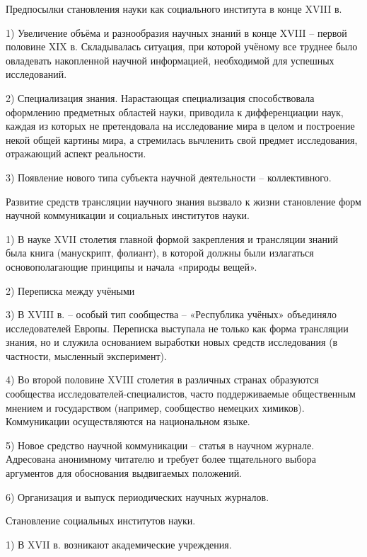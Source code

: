 \documentclass[exam_answers.tex]{subfiles}
\begin{document}
\renewcommand{\baselinestretch}{0.75}

\vspace{-10pt}

Предпосылки становления науки как социального института в конце XVIII в.

1) Увеличение объёма и разнообразия научных знаний в конце XVIII – первой половине XIX в. Складывалась ситуация, при которой учёному все труднее было овладевать накопленной научной информацией, необходимой для успешных исследований.

2) Специализация знания. Нарастающая специализация способствовала оформлению предметных областей науки, приводила к дифференциации наук, каждая из которых не претендовала на исследование мира в целом и построение некой общей картины мира, а стремилась вычленить свой предмет исследования, отражающий аспект реальности.

3) Появление нового типа субъекта научной деятельности – коллективного.

Развитие средств трансляции научного знания вызвало к жизни становление форм научной коммуникации и социальных институтов науки.

1) В науке XVII столетия главной формой закрепления и трансляции знаний была книга (манускрипт, фолиант), в которой должны были излагаться основополагающие принципы и начала «природы вещей».

2) Переписка между учёными

3) В XVIII в. – особый тип сообщества – «Республика учёных» объединяло исследователей Европы. Переписка выступала не только как форма трансляции знания, но и служила основанием выработки новых средств исследования (в частности, мысленный эксперимент).

4) Во второй половине XVIII столетия в различных странах образуются сообщества исследователей-специалистов, часто поддерживаемые общественным мнением и государством (например, сообщество немецких химиков). Коммуникации осуществляются на национальном языке.

5) Новое средство научной коммуникации – статья в научном журнале. Адресована анонимному читателю и требует более тщательного выбора аргументов для обоснования выдвигаемых положений.

6) Организация и выпуск периодических научных журналов.

Становление социальных институтов науки.

1) В XVII в. возникают академические учреждения. 
\end{document}
